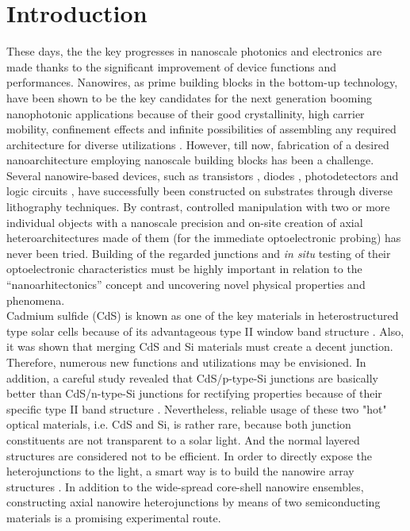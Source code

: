 \section{Introduction}
These days, the the key progresses in nanoscale photonics and electronics are made thanks to the significant improvement of device functions and performances. Nanowires, as prime building blocks in the bottom-up technology, have been shown to be the key candidates for the next generation booming nanophotonic applications because of their good crystallinity, high carrier mobility, confinement effects and infinite possibilities of assembling any required architecture for diverse utilizations \cite{lieberprogramable2014,tsai2014,zhangx2014}. However, till now, fabrication of a desired nanoarchitecture employing nanoscale building blocks has been a challenge. Several nanowire-based devices, such as transistors \cite{577926446,577926447,577926448}, diodes \cite{577926449}, photodetectors \cite{577926451,577926452} and logic circuits \cite{577926453,577926454}, have successfully been constructed on substrates through diverse lithography techniques. By contrast, controlled manipulation with two or more individual objects with a nanoscale precision and on-site creation of axial heteroarchitectures made of them (for the immediate optoelectronic probing) has never been tried. Building of the regarded junctions and \textit{in situ} testing of their optoelectronic characteristics must be highly important in relation to the “nanoarhitectonics” concept and uncovering novel physical properties and phenomena.\\ 

Cadmium sulfide (CdS) is known as one of the key materials in heterostructured type solar cells because of its advantageous type II window band structure  \cite{577926455}. Also, it was shown that merging CdS and Si materials must create a decent junction. Therefore, numerous new functions and  utilizations may be envisioned. In addition, a careful study revealed that CdS/p-type-Si junctions are basically better than CdS/n-type-Si junctions for rectifying properties because of their specific type II band structure \cite{577926457}. Nevertheless, reliable usage of these two "hot" optical materials, i.e. CdS and Si, is rather rare, because both junction constituents are not transparent to a solar light. And the normal layered structures are considered not to be efficient. In order to directly expose the heterojunctions to the light, a smart way is to build the nanowire array structures \cite{577926458,577926459}. In addition to the wide-spread core-shell nanowire ensembles, constructing axial nanowire heterojunctions by means of two semiconducting materials is a promising experimental route.\\

